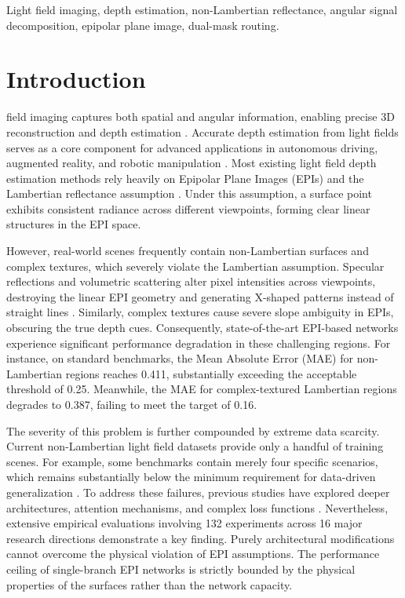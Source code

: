 \documentclass[lettersize,journal]{IEEEtran}
\begin{document}
\begin{IEEEkeywords}
Light field imaging, depth estimation, non-Lambertian reflectance, angular signal decomposition, epipolar plane image, dual-mask routing.
\end{IEEEkeywords}

\section{Introduction}

 field imaging captures both spatial and angular information, enabling precise 3D reconstruction and depth estimation \cite{1}. Accurate depth estimation from light fields serves as a core component for advanced applications in autonomous driving, augmented reality, and robotic manipulation \cite{2}. Most existing light field depth estimation methods rely heavily on Epipolar Plane Images (EPIs) and the Lambertian reflectance assumption \cite{3}. Under this assumption, a surface point exhibits consistent radiance across different viewpoints, forming clear linear structures in the EPI space.

However, real-world scenes frequently contain non-Lambertian surfaces and complex textures, which severely violate the Lambertian assumption. Specular reflections and volumetric scattering alter pixel intensities across viewpoints, destroying the linear EPI geometry and generating X-shaped patterns instead of straight lines \cite{4}. Similarly, complex textures cause severe slope ambiguity in EPIs, obscuring the true depth cues. Consequently, state-of-the-art EPI-based networks experience significant performance degradation in these challenging regions. For instance, on standard benchmarks, the Mean Absolute Error (MAE) for non-Lambertian regions reaches 0.411, substantially exceeding the acceptable threshold of 0.25. Meanwhile, the MAE for complex-textured Lambertian regions degrades to 0.387, failing to meet the target of 0.16.

The severity of this problem is further compounded by extreme data scarcity. Current non-Lambertian light field datasets provide only a handful of training scenes. For example, some benchmarks contain merely four specific scenarios, which remains substantially below the minimum requirement for data-driven generalization \cite{5}. To address these failures, previous studies have explored deeper architectures, attention mechanisms, and complex loss functions \cite{6}. Nevertheless, extensive empirical evaluations involving 132 experiments across 16 major research directions demonstrate a key finding. Purely architectural modifications cannot overcome the physical violation of EPI assumptions. The performance ceiling of single-branch EPI networks is strictly bounded by the physical properties of the surfaces rather than the network capacity.
\end{document}
